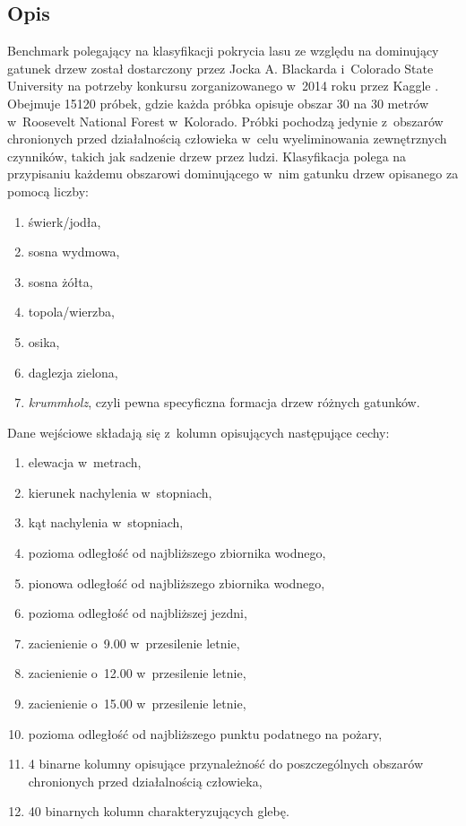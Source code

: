 \documentclass[pl]{minipw} %
\begin{document}
\subsection{Opis}
Benchmark polegający na klasyfikacji pokrycia lasu ze względu na dominujący gatunek drzew został dostarczony przez Jocka A. Blackarda i~Colorado State University na potrzeby konkursu zorganizowanego w~2014 roku przez Kaggle \cite{forest_cover}. Obejmuje 15120 próbek, gdzie każda próbka opisuje obszar 30 na 30 metrów w~Roosevelt National Forest w~Kolorado. Próbki pochodzą jedynie z~obszarów chronionych przed działalnością człowieka w~celu wyeliminowania zewnętrznych czynników, takich jak sadzenie drzew przez ludzi. Klasyfikacja polega na przypisaniu każdemu obszarowi dominującego w~nim gatunku drzew opisanego za pomocą liczby:
\begin{enumerate}
\item świerk/jodła,
\item sosna wydmowa,
\item sosna żółta,
\item topola/wierzba,
\item osika,
\item daglezja zielona,
\item \textit{krummholz}, czyli pewna specyficzna formacja drzew różnych gatunków.
\end{enumerate}
Dane wejściowe składają się z~kolumn opisujących następujące cechy:
\begin{enumerate}
\item elewacja w~metrach,
\item kierunek nachylenia w~stopniach,
\item kąt nachylenia w~stopniach,
\item pozioma odległość od najbliższego zbiornika wodnego,
\item pionowa odległość od najbliższego zbiornika wodnego,
\item pozioma odległość od najbliższej jezdni,
\item zacienienie o~9.00 w~przesilenie letnie,
\item zacienienie o~12.00 w~przesilenie letnie,
\item zacienienie o~15.00 w~przesilenie letnie,
\item pozioma odległość od najbliższego punktu podatnego na pożary,
\item 4 binarne kolumny opisujące przynależność do poszczególnych obszarów chronionych przed działalnością człowieka,
\item 40 binarnych kolumn charakteryzujących glebę.
\end{enumerate}
\end{document}
